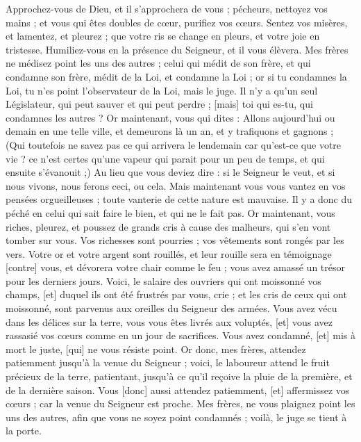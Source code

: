 \begin{multicols}{2}
Approchez-vous de Dieu, et il s'approchera de vous ; pécheurs, nettoyez vos mains ; et vous qui êtes doubles de cœur, purifiez vos cœurs.
Sentez vos misères, et lamentez, et pleurez ; que votre ris se change en pleurs, et votre joie en tristesse.
Humiliez-vous en la présence du Seigneur, et il vous élèvera.
Mes frères ne médisez point les uns des autres ; celui qui médit de son frère, et qui condamne son frère, médit de la Loi, et condamne la Loi ; or si tu condamnes la Loi, tu n'es point l'observateur de la Loi, mais le juge.
Il n'y a qu'un seul Législateur, qui peut sauver et qui peut perdre ; [mais] toi qui es-tu, qui condamnes les autres ?
Or maintenant, vous qui dites : Allons aujourd'hui ou demain en une telle ville, et demeurons là un an, et y trafiquons et gagnons ;
(Qui toutefois ne savez pas ce qui arrivera le lendemain car qu'est-ce que votre vie ? ce n'est certes qu'une vapeur qui parait pour un peu de temps, et qui ensuite s'évanouit ;)
Au lieu que vous deviez dire : si le Seigneur le veut, et si nous vivons, nous ferons ceci, ou cela.
Mais maintenant vous vous vantez en vos pensées orgueilleuses ; toute vanterie de cette nature est mauvaise.
Il y a donc du péché en celui qui sait faire le bien, et qui ne le fait pas.
\VerseOne{}Or maintenant, vous riches, pleurez, et poussez de grands cris à cause des malheurs, qui s’en vont tomber sur vous.
Vos richesses sont pourries ; vos vêtements sont rongés par les vers.
Votre or et votre argent sont rouillés, et leur rouille sera en témoignage [contre] vous, et dévorera votre chair comme le feu ; vous avez amassé un trésor pour les derniers jours.
Voici, le salaire des ouvriers qui ont moissonné vos champs, [et] duquel ils ont été frustrés par vous, crie ; et les cris de ceux qui ont moissonné, sont parvenus aux oreilles du Seigneur des armées.
Vous avez vécu dans les délices sur la terre, vous vous êtes livrés aux voluptés, [et] vous avez rassasié vos cœurs comme en un jour de sacrifices.
Vous avez condamné, [et] mis à mort le juste, [qui] ne vous résiste point.
Or donc, mes frères, attendez patiemment jusqu'à la venue du Seigneur ; voici, le laboureur attend le fruit précieux de la terre, patientant, jusqu'à ce qu'il reçoive la pluie de la première, et de la dernière saison.
Vous [donc] aussi attendez patiemment, [et] affermissez vos cœurs ; car la venue du Seigneur est proche.
Mes frères, ne vous plaignez point les uns des autres, afin que vous ne soyez point condamnés ; voilà, le juge se tient à la porte.

\end{multicols}
